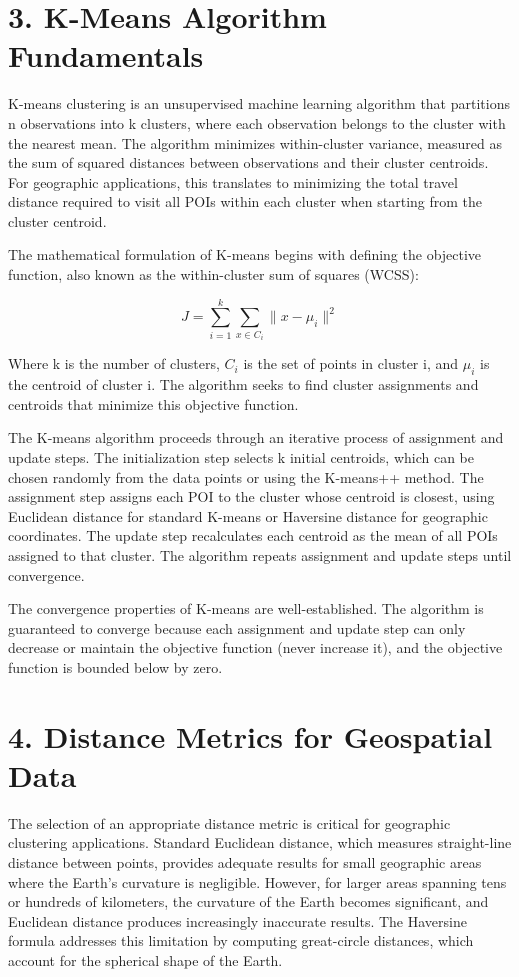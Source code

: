 \section{3. K-Means Algorithm Fundamentals}

K-means clustering is an unsupervised machine learning algorithm that partitions n observations into k clusters, where each observation belongs to the cluster with the nearest mean. The algorithm minimizes within-cluster variance, measured as the sum of squared distances between observations and their cluster centroids. For geographic applications, this translates to minimizing the total travel distance required to visit all POIs within each cluster when starting from the cluster centroid.

The mathematical formulation of K-means begins with defining the objective function, also known as the within-cluster sum of squares (WCSS):

\begin{equation}
J = \sum_{i=1}^{k} \sum_{x \in C_i} \|x - \mu_i\|^2
\end{equation}

Where k is the number of clusters, $C_i$ is the set of points in cluster i, and $\mu_i$ is the centroid of cluster i. The algorithm seeks to find cluster assignments and centroids that minimize this objective function.

The K-means algorithm proceeds through an iterative process of assignment and update steps. The initialization step selects k initial centroids, which can be chosen randomly from the data points or using the K-means++ method. The assignment step assigns each POI to the cluster whose centroid is closest, using Euclidean distance for standard K-means or Haversine distance for geographic coordinates. The update step recalculates each centroid as the mean of all POIs assigned to that cluster. The algorithm repeats assignment and update steps until convergence.

The convergence properties of K-means are well-established. The algorithm is guaranteed to converge because each assignment and update step can only decrease or maintain the objective function (never increase it), and the objective function is bounded below by zero.

\section{4. Distance Metrics for Geospatial Data}

The selection of an appropriate distance metric is critical for geographic clustering applications. Standard Euclidean distance, which measures straight-line distance between points, provides adequate results for small geographic areas where the Earth's curvature is negligible. However, for larger areas spanning tens or hundreds of kilometers, the curvature of the Earth becomes significant, and Euclidean distance produces increasingly inaccurate results. The Haversine formula addresses this limitation by computing great-circle distances, which account for the spherical shape of the Earth.

